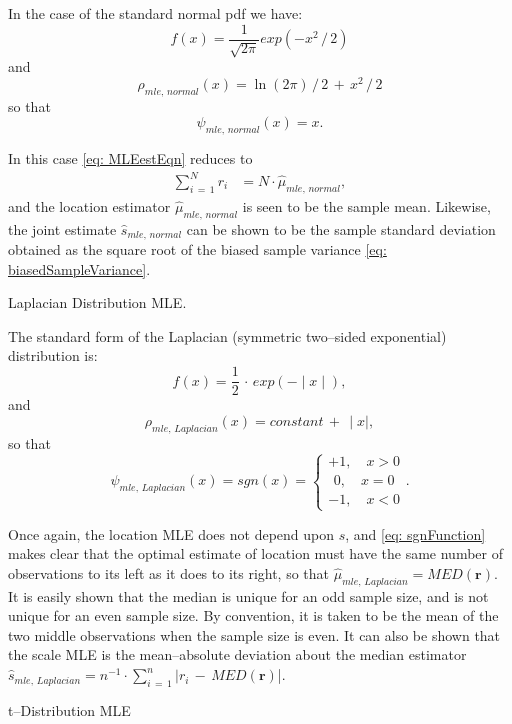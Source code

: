 \documentclass[graybox,envcountchap,sectrefs]{svmono}\usepackage[]{graphicx}\usepackage[]{xcolor}
\begin{document}
\begin{appendices}
\begin{example}
In the case of the standard normal pdf we have:
\begin{equation}
f(x)=\frac{1}{\sqrt{2\pi}}exp\left(-x^{2}\,/\,2\right)\label{eq:StandardNormalPdf}
\end{equation}
and 
\begin{equation}
\rho_{mle,\,normal}(x)=\ln(2\pi)\,/\,2\,+\,x^{2}\,/\,2\label{eq:rhoStandardNormal}
\end{equation}
so that 
\begin{equation}
\psi_{mle,\,normal}(x)=x.\label{eq:psiNormalMLE}
\end{equation}
\end{example}
In this case \eqref{eq: MLEestEqn} reduces to
\begin{align}
\sum_{i\,=\,1}^{N}r_{i} & =N\cdot\hat{\mu}_{mle,\,normal},\label{eq:NormalMLEsolution}
\end{align}
and the location estimator $\hat{\mu}_{mle,\,normal}$ is seen to
be the sample mean. Likewise, the joint estimate $\hat{s}_{mle,\,normal}$
can be shown to be the sample standard deviation obtained as the square
root of the biased sample variance \eqref{eq: biasedSampleVariance}.
\begin{example}
Laplacian Distribution MLE.\label{exa:LaplacianDistributionMLE.}

The standard form of the Laplacian (symmetric two--sided exponential)
distribution is:
\begin{equation}
f(x)=\frac{1}{2}\,\cdot\,exp\left(-\mid x\mid\right),\label{eq:StandardLaplacianPdf}
\end{equation}
and
\begin{equation}
\rho_{mle,\,Laplacian}(x)=constant\,+\,\mid x\mid,\label{eq:rhoStandardLaplacian}
\end{equation}
so that
\begin{equation}
\psi_{mle,\,Laplacian}(x)=sgn(x)=\left\{ \begin{array}{c}
+1,\quad x>0\\
\ \,0,\quad x=0\\
-1,\quad x<0
\end{array}\right..\label{eq: sgnFunction}
\end{equation}
\end{example}
Once again, the location MLE does not depend upon $s$, and \eqref{eq: sgnFunction}
makes clear that the optimal estimate of location must have the same
number of observations to its left as it does to its right, so that
$\hat{\mu}_{mle,\,Laplacian}=MED(\mathbf{r}).$ It is easily shown
that the median is unique for an odd sample size, and is not unique
for an even sample size. By convention, it is taken to be the mean
of the two middle observations when the sample size is even. It can
also be shown that the scale MLE is the mean--absolute deviation
about the median estimator $\hat{s}_{mle,\,Laplacian}=n^{-1}\cdot\sum_{i\,=\,1}^{n}|r_{i}\,-\,MED(\mathbf{r})$|. 
\begin{example}
t--Distribution MLE\label{exa:tDistributionMLE}


\end{example}
\end{appendices}
\end{document}
